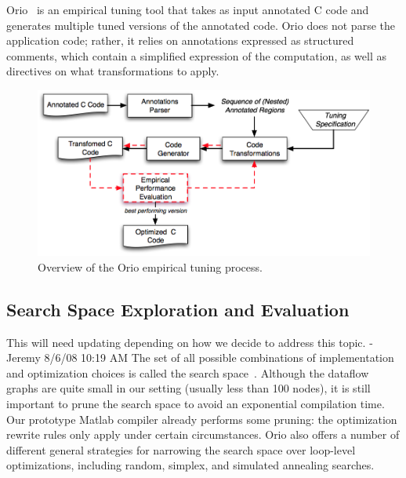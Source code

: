 \documentclass[11pt]{article}
\begin{document}
Orio~\cite{Norris:2007} is an empirical tuning tool that takes as input annotated C code and generates multiple tuned versions of the annotated code. Orio does not parse the application code; rather, it relies on annotations expressed as structured comments, which contain a simplified expression of the computation, as well as directives on what transformations to apply.




\begin{figure}[htbp]
\centering
\includegraphics[width=.7\textwidth]{figures/orio.png}
\caption{Overview of the Orio empirical tuning process.}
\label{fig:orio}
\end{figure}

\subsection{Search Space Exploration and Evaluation}
\label{sec:search}

This will need updating depending on how we decide to address this topic. -Jeremy 8/6/08 10:19 AM
The set of all possible combinations of implementation and optimization choices is called the search space~\cite{Kisuki:2000uq,Triantafyllis:2003uq, Cooper:2005kx}.  Although the dataflow graphs are quite small in our setting (usually less than 100 nodes), it is still important to prune the search space to avoid an exponential compilation time. Our prototype Matlab compiler already performs some pruning: the optimization rewrite rules only apply under certain circumstances. 
%
%
Orio also offers a number of different general strategies for narrowing the search space over loop-level optimizations, including random, simplex, and simulated annealing searches.
\end{document}
